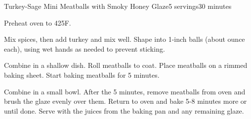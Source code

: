 \documentclass[../Cookbook.tex]{subfiles}
\begin{document}
\begin{recipe}{Turkey-Sage Mini Meatballs with Smoky Honey Glaze}{5 servings}{30 minutes}

Preheat oven to 425\0F.

Mix spices, then add turkey and mix well. Shape into 1-inch balls (about  ounce each), using wet hands as needed to prevent sticking.

Combine in a shallow dish. Roll meatballs to coat. Place meatballs on a rimmed baking sheet.
Start baking meatballs for 5 minutes.

Combine in a small bowl. After the 5 minutes, remove meatballs from oven and brush the glaze evenly over them. Return to oven and bake 5-8 minutes more or until done. Serve with the juices from the baking pan and any remaining glaze.

\end{recipe}
\end{document}
